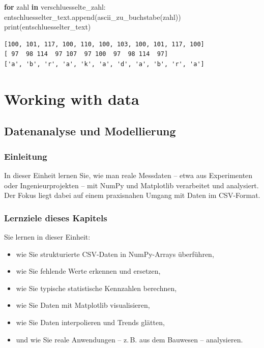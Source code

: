 \documentclass[
  letterpaper,
  DIV=11,
  numbers=noendperiod]{scrreprt}
\newenvironment{Shaded}{\begin{snugshade}}{\end{snugshade}}
\newcommand{\BuiltInTok}[1]{\textcolor[rgb]{0.00,0.23,0.31}{#1}}
\newcommand{\ControlFlowTok}[1]{\textcolor[rgb]{0.00,0.23,0.31}{\textbf{#1}}}
\newcommand{\KeywordTok}[1]{\textcolor[rgb]{0.00,0.23,0.31}{\textbf{#1}}}
\newcommand{\NormalTok}[1]{\textcolor[rgb]{0.00,0.23,0.31}{#1}}
\providecommand{\tightlist}{%
  \setlength{\itemsep}{0pt}\setlength{\parskip}{0pt}}\usepackage{longtable,booktabs,array}
\begin{document}
\begin{tcolorbox}
\begin{tcolorbox}
\begin{Shaded}
\begin{Highlighting}[]
\ControlFlowTok{for}\NormalTok{ zahl }\KeywordTok{in}\NormalTok{ verschluesselte\_zahl:    }
\NormalTok{    entschluesselter\_text.append(ascii\_zu\_buchstabe(zahl))}
\BuiltInTok{print}\NormalTok{(entschluesselter\_text)}
\end{Highlighting}
\end{Shaded}

\begin{verbatim}
[100, 101, 117, 100, 110, 100, 103, 100, 101, 117, 100]
[ 97  98 114  97 107  97 100  97  98 114  97]
['a', 'b', 'r', 'a', 'k', 'a', 'd', 'a', 'b', 'r', 'a']
\end{verbatim}

\end{tcolorbox}

\end{tcolorbox}

\part{Working with data}

\chapter{Datenanalyse und
Modellierung}\label{datenanalyse-und-modellierung}

\section{Einleitung}\label{einleitung-1}

In dieser Einheit lernen Sie, wie man reale Messdaten -- etwa aus
Experimenten oder Ingenieurprojekten -- mit NumPy und Matplotlib
verarbeitet und analysiert. Der Fokus liegt dabei auf einem praxisnahen
Umgang mit Daten im CSV-Format.

\section{Lernziele dieses Kapitels}\label{lernziele-dieses-kapitels-5}

Sie lernen in dieser Einheit:

\begin{itemize}
\tightlist
\item
  wie Sie strukturierte CSV-Daten in NumPy-Arrays überführen,
\item
  wie Sie fehlende Werte erkennen und ersetzen,
\item
  wie Sie typische statistische Kennzahlen berechnen,
\item
  wie Sie Daten mit Matplotlib visualisieren,
\item
  wie Sie Daten interpolieren und Trends glätten,
\item
  und wie Sie reale Anwendungen -- z.\,B. aus dem Bauwesen --
  analysieren.
\end{itemize}
\end{document}
